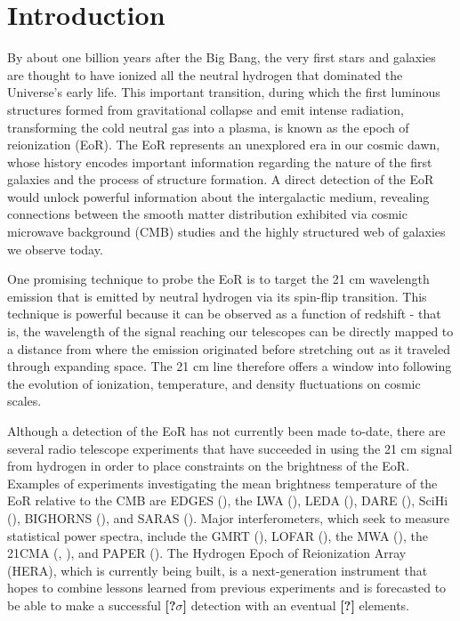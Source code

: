 \documentclass[preprint2,numberedappendix,tighten,twocolappendix]{aastex6}  %
\newcommand{\cc}[1]{{\color{purple} \textbf{[#1]}}}
\begin{document}
\section{Introduction}
\label{sec:Intro}

By about one billion years after the Big Bang, the very first stars and galaxies are thought to have ionized all the neutral hydrogen that dominated the Universe's early life. This important transition, during which the first luminous structures formed from gravitational collapse and emit intense radiation, transforming the cold neutral gas into a plasma, is known as the epoch of reionization (EoR). The EoR represents an unexplored era in our cosmic dawn, whose history encodes important information regarding the nature of the first galaxies and the process of structure formation. A direct detection of the EoR would unlock powerful information about the intergalactic medium, revealing connections between the smooth matter distribution exhibited via cosmic microwave background (CMB) studies and the highly structured web of galaxies we observe today.

One promising technique to probe the EoR is to target the 21 cm wavelength emission that is emitted by neutral hydrogen via its spin-flip transition. This technique is powerful because it can be observed as a function of redshift - that is, the wavelength of the signal reaching our telescopes can be directly mapped to a distance from where the emission originated before stretching out as it traveled through expanding space. The 21 cm line therefore offers a window into following the evolution of ionization, temperature, and density fluctuations on cosmic scales.

Although a detection of the EoR has not currently been made to-date, there are several radio telescope experiments that have succeeded in using the 21 cm signal from hydrogen in order to place constraints on the brightness of the EoR. Examples of experiments investigating the mean brightness temperature of the EoR relative to the CMB are EDGES (\citealt{bowman2010}), the LWA (\citealt{ellingson_et_al2009}), LEDA (\citealt{greenhill_bernardi2012}), DARE (\citealt{burns2012}), SciHi (\citealt{voytek2014}), BIGHORNS (\citealt{sokolowski2015}), and SARAS (\citealt{patra2015}). Major interferometers, which seek to measure statistical power spectra, include the GMRT (\citealt{paciga_et_al2013}), LOFAR (\citealt{van_haarlem_et_al2013}), the MWA (\citealt{tingay_et_al2013}), the 21CMA (\citealt{peterson_et_al2004}, \citealt{wu2009}), and PAPER (\citealt{parsons_et_al2010}). The Hydrogen Epoch of Reionization Array (HERA), which is currently being built, is a next-generation instrument that hopes to combine lessons learned from previous experiments and is forecasted to be able to make a successful \cc{?$\sigma$} detection with an eventual \cc{?} elements.
\end{document}
